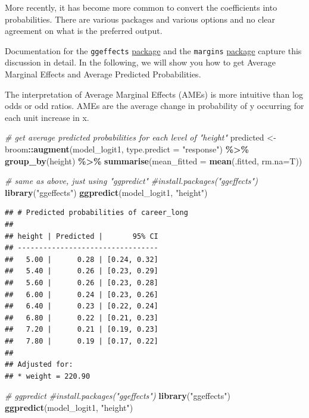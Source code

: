 \documentclass[
]{book}
\newenvironment{Shaded}{\begin{snugshade}}{\end{snugshade}}
\newcommand{\AttributeTok}[1]{\textcolor[rgb]{0.13,0.29,0.53}{#1}}
\newcommand{\CommentTok}[1]{\textcolor[rgb]{0.56,0.35,0.01}{\textit{#1}}}
\newcommand{\FunctionTok}[1]{\textcolor[rgb]{0.13,0.29,0.53}{\textbf{#1}}}
\newcommand{\NormalTok}[1]{#1}
\newcommand{\OtherTok}[1]{\textcolor[rgb]{0.56,0.35,0.01}{#1}}
\newcommand{\SpecialCharTok}[1]{\textcolor[rgb]{0.81,0.36,0.00}{\textbf{#1}}}
\newcommand{\StringTok}[1]{\textcolor[rgb]{0.31,0.60,0.02}{#1}}
\begin{document}
More recently, it has become more common to convert the coefficients into probabilities.
There are various packages and various options and no clear agreement on what is
the preferred output.

Documentation for the \texttt{ggeffects} \href{https://strengejacke.github.io/ggeffects/index.html}{package} and the \texttt{margins} \href{https://thomasleeper.com/margins/}{package} capture this discussion in detail. In the following, we will show you how to get Average Marginal Effects
and Average Predicted Probabilities.

The interpretation of Average Marginal Effects (AMEs) is more intuitive than log odds
or odd ratios. AMEs are the average change in probability of y occurring for each unit increase
in x.

\begin{Shaded}
\begin{Highlighting}[]
\CommentTok{\# get average predicted probabilities for each level of "height"}
\NormalTok{predicted }\OtherTok{\textless{}{-}}\NormalTok{ broom}\SpecialCharTok{::}\FunctionTok{augment}\NormalTok{(model\_logit1, }\AttributeTok{type.predict =} \StringTok{"response"}\NormalTok{) }\SpecialCharTok{\%\textgreater{}\%}
  \FunctionTok{group\_by}\NormalTok{(height) }\SpecialCharTok{\%\textgreater{}\%}
  \FunctionTok{summarise}\NormalTok{(}\AttributeTok{mean\_fitted =} \FunctionTok{mean}\NormalTok{(.fitted, }\AttributeTok{rm.na=}\NormalTok{T))}

\CommentTok{\# same as above, just using "ggpredict"}
\CommentTok{\#install.packages("ggeffects")}
\FunctionTok{library}\NormalTok{(}\StringTok{"ggeffects"}\NormalTok{)}
\FunctionTok{ggpredict}\NormalTok{(model\_logit1, }\StringTok{"height"}\NormalTok{)}
\end{Highlighting}
\end{Shaded}

\begin{verbatim}
## # Predicted probabilities of career_long
## 
## height | Predicted |       95% CI
## ---------------------------------
##   5.00 |      0.28 | [0.24, 0.32]
##   5.40 |      0.26 | [0.23, 0.29]
##   5.60 |      0.26 | [0.23, 0.28]
##   6.00 |      0.24 | [0.23, 0.26]
##   6.40 |      0.23 | [0.22, 0.24]
##   6.80 |      0.22 | [0.21, 0.23]
##   7.20 |      0.21 | [0.19, 0.23]
##   7.80 |      0.19 | [0.17, 0.22]
## 
## Adjusted for:
## * weight = 220.90
\end{verbatim}

\begin{Shaded}
\begin{Highlighting}[]
\CommentTok{\# ggpredict}
\CommentTok{\#install.packages("ggeffects")}
\FunctionTok{library}\NormalTok{(}\StringTok{"ggeffects"}\NormalTok{)}
\FunctionTok{ggpredict}\NormalTok{(model\_logit1, }\StringTok{"height"}\NormalTok{)}
\end{Highlighting}
\end{Shaded}
\end{document}

